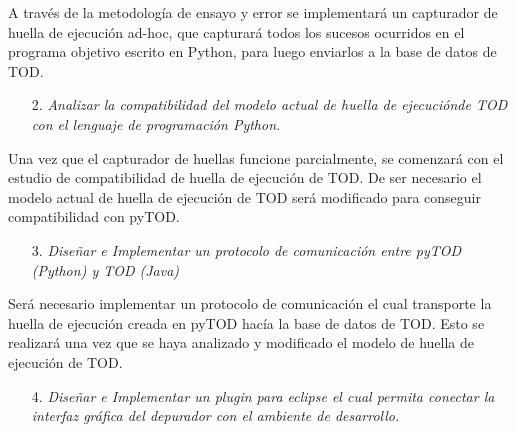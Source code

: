\documentclass[12pt,legalpaper]{report}
\begin{document}
A través de la metodología de ensayo y error se implementará un capturador de huella de ejecución ad-hoc, que capturará todos los sucesos ocurridos en el programa objetivo escrito en Python, para luego enviarlos a la base de datos de TOD.


\begin{itemize}
\item[2.] \textit{Analizar la compatibilidad del modelo actual de huella de ejecución\footnotemark[2] de TOD con el lenguaje de programación Python.}
\end{itemize}


Una vez que el capturador de huellas funcione parcialmente, se comenzará con el estudio de compatibilidad de huella de ejecución de TOD.  De ser necesario el modelo actual de huella de ejecución de TOD será modificado para conseguir compatibilidad con pyTOD.

\begin{itemize}
\item[3.] \textit{Diseñar e Implementar un protocolo de comunicación entre pyTOD (Python) y TOD (Java)}
\end{itemize}

Será necesario implementar un protocolo de comunicación el cual transporte la huella de ejecución creada en pyTOD hacía la base de datos de TOD.  Esto se realizará una vez que se haya analizado y modificado el modelo de huella de ejecución de TOD.



\begin{itemize}
\item[4.] \textit{Diseñar e Implementar un plugin para eclipse el cual permita conectar la interfaz gráfica del depurador con el ambiente de desarrollo.}
\end{itemize}
\end{document}
